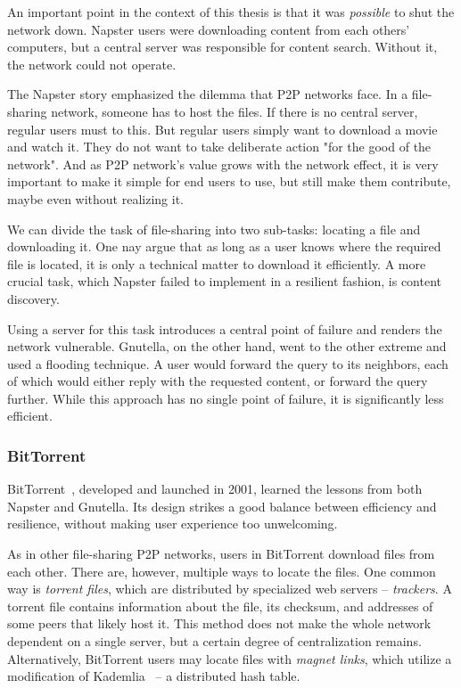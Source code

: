 An important point in the context of this thesis is that it was \textit{possible} to shut the network down.
Napster users were downloading content from each others' computers, but a central server was responsible for content search.
Without it, the network could not operate.

The Napster story emphasized the dilemma that P2P networks face.
In a file-sharing network, someone has to host the files.
If there is no central server, regular users must to this.
But regular users simply want to download a movie and watch it.
They do not want to take deliberate action "for the good of the network".
And as P2P network's value grows with the network effect, it is very important to make it simple for end users to use, but still make them contribute, maybe even without realizing it.

We can divide the task of file-sharing into two sub-tasks: locating a file and downloading it.
One nay argue that as long as a user knows where the required file is located, it is only a technical matter to download it efficiently.
A more crucial task, which Napster failed to implement in a resilient fashion, is content discovery.

Using a server for this task introduces a central point of failure and renders the network vulnerable.
Gnutella, on the other hand, went to the other extreme and used a flooding technique.
A user would forward the query to its neighbors, each of which would either reply with the requested content, or forward the query further.
While this approach has no single point of failure, it is significantly less efficient.


\subsubsection{BitTorrent}

BitTorrent~\cite{Pouwelse2005}, developed and launched in 2001, learned the lessons from both Napster and Gnutella.
Its design strikes a good balance between efficiency and resilience, without making user experience too unwelcoming.

As in other file-sharing P2P networks, users in BitTorrent download files from each other.
There are, however, multiple ways to locate the files.
One common way is \textit{torrent files}, which are distributed by specialized web servers -- \textit{trackers}.
A torrent file contains information about the file, its checksum, and addresses of some peers that likely host it.
This method does not make the whole network dependent on a single server, but a certain degree of centralization remains.
Alternatively, BitTorrent users may locate files with \textit{magnet links}, which utilize a modification of Kademlia~\cite{Maymounkov2002} -- a distributed hash table.

